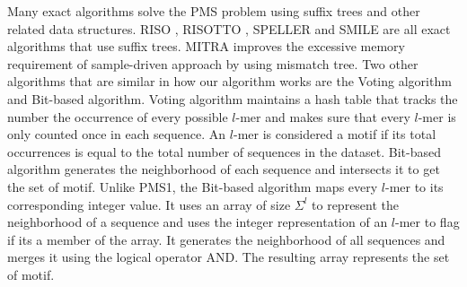 	Many exact algorithms solve the PMS problem using suffix trees and other related data structures. RISO \cite{Carvalho05ahighly}, RISOTTO \cite{Pisanti06risotto}, SPELLER \cite{Sagot98spellingapproximate} and SMILE are all exact algorithms that use suffix trees. MITRA \cite{eskin2002finding} improves the excessive memory requirement of sample-driven approach by using mismatch tree. Two other algorithms that are similar in how our algorithm works are the Voting algorithm and Bit-based algorithm. Voting algorithm \cite{Chin2005} maintains a hash table that tracks the number the occurrence of every possible $l$-mer and makes sure that every $l$-mer is only counted once in each sequence. An $l$-mer is considered a motif if its total occurrences is equal to the total number of sequences in the dataset. Bit-based algorithm \cite{dasari2010efficient} generates the neighborhood of each sequence and intersects it to get the set of motif. Unlike PMS1, the Bit-based algorithm maps every $l$-mer to its corresponding integer value. It uses an array of size $\Sigma^l$ to represent the neighborhood of a sequence and uses the integer representation of an $l$-mer to flag if its a member of the array. It generates the neighborhood of all sequences and merges it using the logical operator AND. The resulting array represents the set of motif.

	